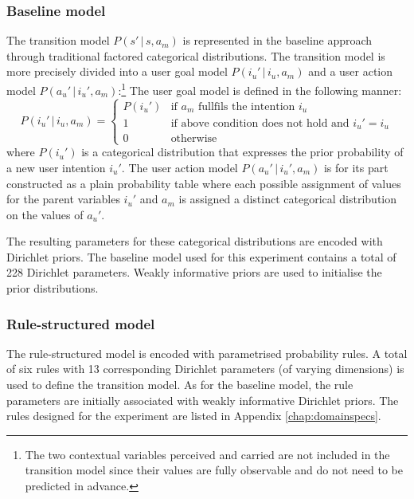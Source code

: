 


\subsubsection*{Baseline model}

The transition model $P(s'\, | \, s, a_m)$ is represented in the baseline approach through traditional factored categorical distributions. The transition model is more precisely divided into a user goal model $P(i_u'\, | \, i_u, a_m)$ and a user action model $P(a_u' \, | \, i_u',a_m)$:\footnote{The two contextual variables $\mathrm{perceived}$ and $\mathrm{carried}$ are not included in the transition model since their values are fully observable and do not need to be predicted in advance.} The user goal model is defined in the following manner:
\begin{equation}
P(i_u' \, | \, i_u, a_m) = \begin{cases}
P(i_u') & \text{if } a_m \text{ fullfils the intention } i_u \\
1 & \text{if above condition does not hold and } i_u' = i_u \\
0 & \text{otherwise} \end{cases} \nonumber
\end{equation}
where $P(i_u')$ is a categorical distribution that expresses the prior probability of a new user intention $i_u'$. The user action model $P(a_u' \, | \, i_u',a_m)$ is for its part constructed as a plain probability table where each possible assignment of values for the parent variables $i_u'$ and $a_m$ is assigned a distinct categorical distribution on the values of $a_u'$. 

The resulting parameters for these categorical distributions are encoded with Dirichlet priors.  The baseline model used for this experiment contains a total of 228 Dirichlet parameters.  Weakly informative priors are used to initialise the prior distributions.

\subsubsection*{Rule-structured model}

The rule-structured model is encoded with parametrised probability rules. A total of six rules with 13 corresponding Dirichlet parameters (of varying dimensions) is used to define the transition model.   As for the baseline model, the rule parameters are initially associated with weakly informative Dirichlet priors.  The rules designed for the experiment are listed in Appendix \ref{chap:domainspecs}.

